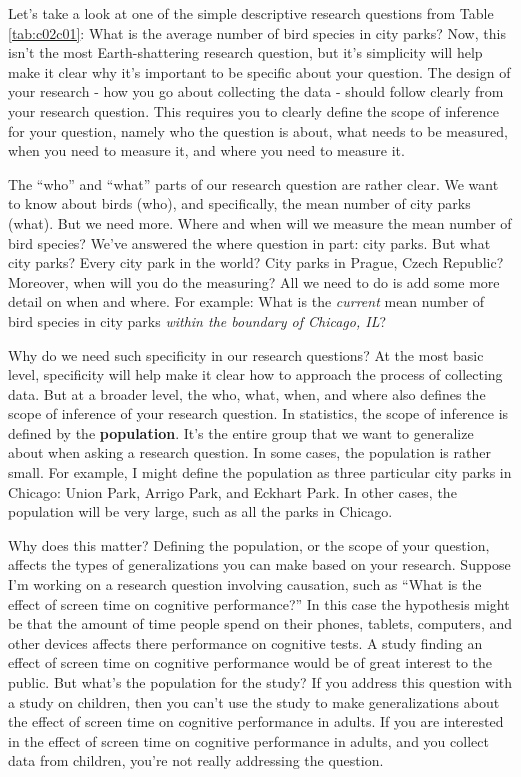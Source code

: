 \documentclass[
]{book}
\begin{document}
Let's take a look at one of the simple descriptive research questions from Table \ref{tab:c02c01}: What is the average number of bird species in city parks? Now, this isn't the most Earth-shattering research question, but it's simplicity will help make it clear why it's important to be specific about your question. The design of your research - how you go about collecting the data - should follow clearly from your research question. This requires you to clearly define the scope of inference for your question, namely who the question is about, what needs to be measured, when you need to measure it, and where you need to measure it.

The ``who'' and ``what'' parts of our research question are rather clear. We want to know about birds (who), and specifically, the mean number of city parks (what). But we need more. Where and when will we measure the mean number of bird species? We've answered the where question in part: city parks. But what city parks? Every city park in the world? City parks in Prague, Czech Republic? Moreover, when will you do the measuring? All we need to do is add some more detail on when and where. For example: What is the \emph{current} mean number of bird species in city parks \emph{within the boundary of Chicago, IL}?

Why do we need such specificity in our research questions? At the most basic level, specificity will help make it clear how to approach the process of collecting data. But at a broader level, the who, what, when, and where also defines the scope of inference of your research question. In statistics, the scope of inference is defined by the \textbf{population}. It's the entire group that we want to generalize about when asking a research question. In some cases, the population is rather small. For example, I might define the population as three particular city parks in Chicago: Union Park, Arrigo Park, and Eckhart Park. In other cases, the population will be very large, such as all the parks in Chicago.

Why does this matter? Defining the population, or the scope of your question, affects the types of generalizations you can make based on your research. Suppose I'm working on a research question involving causation, such as ``What is the effect of screen time on cognitive performance?'' In this case the hypothesis might be that the amount of time people spend on their phones, tablets, computers, and other devices affects there performance on cognitive tests. A study finding an effect of screen time on cognitive performance would be of great interest to the public. But what's the population for the study? If you address this question with a study on children, then you can't use the study to make generalizations about the effect of screen time on cognitive performance in adults. If you are interested in the effect of screen time on cognitive performance in adults, and you collect data from children, you're not really addressing the question.
\end{document}

